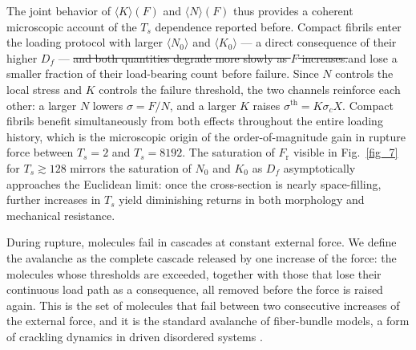 \documentclass[aps,physrev,preprint,groupedaddress,linenumbers]{revtex4-2}
\newcommand{\added}[1]{{\color{red}#1}}
\newcommand{\deleted}[1]{{\color{red}\sout{#1}}}
\begin{document}
The joint behavior of $\langle K \rangle(F)$ and $\langle N \rangle(F)$ thus provides a coherent microscopic account of the $T_s$ dependence reported before. Compact fibrils enter the loading protocol with larger $\langle N_0 \rangle$ and $\langle K_0 \rangle$ — a direct consequence of their higher $D_f$ — \deleted{and both quantities degrade more slowly as $F$ increases.}\added{and lose a smaller fraction of their load-bearing count before failure.} Since $N$ controls the local stress and $K$ controls the failure threshold, the two channels reinforce each other: a larger $N$ lowers $\sigma = F/N$, and a larger $K$ raises $\sigma^\text{th} = K\sigma_c X$. Compact fibrils benefit simultaneously from both effects throughout the entire loading history, which is the microscopic origin of the order-of-magnitude gain in rupture force between $T_s = 2$ and $T_s = 8192$. The saturation of $F_\text{r}$ visible in Fig.~\ref{fig_7} for $T_s \gtrsim 128$ mirrors the saturation of $N_0$ and $K_0$ as $D_f$ asymptotically approaches the Euclidean limit: once the cross-section is nearly space-filling, further increases in $T_s$ yield diminishing returns in both morphology and mechanical resistance.


During rupture, molecules fail in cascades at constant external force. We define the avalanche as the complete cascade released by one increase of the force: the molecules whose thresholds are exceeded, together with those that lose their continuous load path as a consequence, all removed before the force is raised again. This is the set of molecules that fail between two consecutive increases of the external force, and it is the standard avalanche of fiber-bundle models, a form of crackling dynamics in driven disordered systems \cite{Jaeger1992,Godano1993,Beggs2003,Baraba1996,Alencar2001,Suki1994}. 
\end{document}
